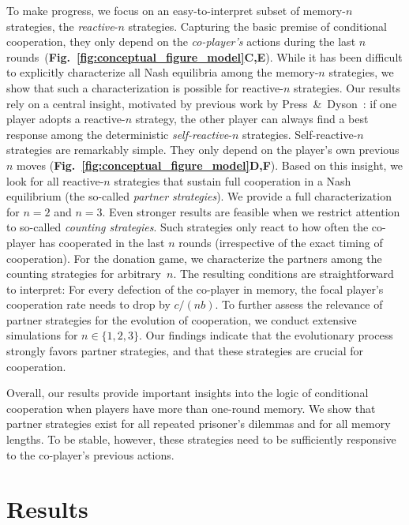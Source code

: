\documentclass[11pt]{article}
\newcommand{\figref}[1]{{\textbf{Fig.~\ref{#1}}}}
\begin{document}
To make progress, we focus on an easy-to-interpret subset of memory-$n$ strategies, the {\it reactive}-$n$ strategies. 
Capturing the basic premise of conditional cooperation, they only depend on the {\it co-player's} actions during the last $n$ rounds~(\figref{fig:conceptual_figure_model}\textbf{C,E}). 
While it has been difficult to explicitly characterize all Nash equilibria among the memory-$n$ strategies, we show that such a characterization is possible for reactive-$n$ strategies. 
Our results rely on a central insight, motivated by previous work by Press~\&~Dyson~\citep{press:PNAS:2012}: 
if one player adopts a reactive-$n$ strategy, the other player can always find a best response among the deterministic {\it self-reactive}-$n$ strategies. 
Self-reactive-$n$ strategies are remarkably simple. 
They only depend on the player's own previous $n$ moves (\figref{fig:conceptual_figure_model}\textbf{D,F}).
Based on this insight, we look for all reactive-$n$ strategies that sustain full cooperation in a Nash equilibrium (the so-called {\it partner strategies}). 
We provide a full characterization for $n\!=\!2$ and $n\!=\!3$.
Even stronger results are feasible when we restrict attention to so-called {\it counting strategies}.  
Such strategies only react to how often the co-player has cooperated in the last $n$ rounds (irrespective of the exact timing of cooperation). 
For the donation game, we characterize the partners among the counting strategies for arbitrary~$n$. 
The resulting conditions are straightforward to interpret:
For every defection of the co-player in memory, the focal player's cooperation rate needs to drop by $c/(nb)$.
To further assess the relevance of partner strategies for the evolution of cooperation, we conduct extensive simulations for $n\!\in\!\{1,2,3\}$. 
Our findings indicate that the evolutionary process strongly favors partner strategies, and that these strategies are crucial for cooperation. 

Overall, our results provide important insights into the logic of conditional cooperation when players have more than one-round memory. 
We show that partner strategies exist for all repeated prisoner's dilemmas and for all memory lengths. 
To be stable, however, these strategies need to be sufficiently responsive to the co-player's previous actions. 




\section*{Results}
\end{document}
